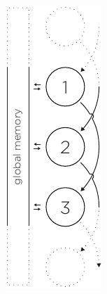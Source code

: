 \begin{figure}
  \begin{minipage}[t]{0.20\textwidth}
    \centering
    \includegraphics[page=3, height=2\linewidth]{../resources/invariance.pdf}
    \vfill

\end{minipage}
\end{figure}
